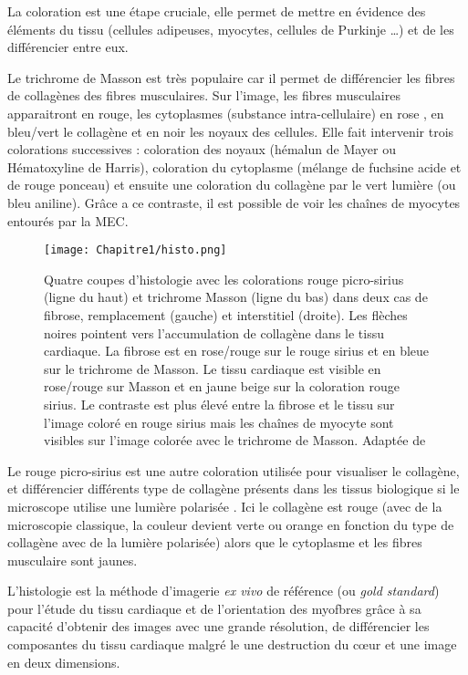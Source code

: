 La coloration est une étape cruciale, elle permet de mettre en évidence des éléments du tissu (cellules adipeuses, myocytes, cellules de Purkinje …) et de les différencier entre eux.

Le trichrome de Masson est très populaire car il permet de différencier les fibres de collagènes des fibres musculaires. Sur l’image, les fibres musculaires apparaitront en rouge, les cytoplasmes (substance intra-cellulaire) en rose , en bleu/vert le collagène et en noir les noyaux des cellules. Elle fait intervenir trois colorations successives : coloration des noyaux (hémalun de Mayer ou Hématoxyline de Harris), coloration du cytoplasme (mélange de fuchsine acide et de rouge ponceau) et ensuite une coloration du collagène par le vert lumière (ou bleu aniline)\cite{Golberg2024}. Grâce a ce contraste, il est possible de voir les chaînes de myocytes entourés par la MEC.

\begin{figure}[!htbp]
  \begin{center}
    \texttt{[image: Chapitre1/histo.png]}
     \end{center}
    \caption{Quatre coupes d’histologie avec les colorations rouge picro-sirius (ligne du haut) et trichrome Masson (ligne du bas) dans deux cas de fibrose, remplacement (gauche) et interstitiel (droite). Les flèches noires pointent vers l’accumulation de collagène dans le tissu cardiaque. La fibrose est en rose/rouge sur le rouge sirius et en bleue sur le trichrome de Masson. Le tissu cardiaque est visible en rose/rouge sur Masson et en jaune \/ beige sur la coloration rouge sirius. Le contraste est plus élevé entre la fibrose et le tissu sur l’image coloré en rouge sirius mais les chaînes de myocyte sont visibles sur l’image colorée avec le trichrome de Masson. Adaptée de \cite{Qi2022}}
  \label{fig:histo}
\end{figure}

Le rouge picro-sirius est une autre coloration utilisée pour visualiser le collagène, et différencier différents type de collagène présents dans les tissus biologique si le microscope utilise une lumière polarisée\cite{Puchtler_1973} . Ici le collagène est rouge (avec de la microscopie classique, la couleur devient verte ou orange en fonction du type de collagène avec de la lumière polarisée) alors que le cytoplasme et les fibres musculaire sont jaunes.

L’histologie est la méthode d’imagerie \textit{ex vivo} de référence (ou \textit{gold standard}) pour l’étude du tissu cardiaque et de l’orientation des myofbres grâce à sa capacité d’obtenir des images avec une grande résolution, de différencier les composantes du tissu cardiaque malgré le une destruction du cœur et une image en deux dimensions.

